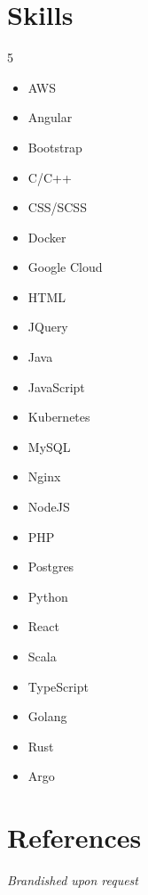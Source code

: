 \documentclass[letterpaper,11pt]{article}
\begin{document}
\section{Skills}
    \begin{multicols}{5}
    \begin{itemize}
        \item AWS
        \item Angular
        \item Bootstrap
        \item C/C++
        \item CSS/SCSS
        \item Docker
        \item Google Cloud
        \item HTML
        \item JQuery
        \item Java
        \item JavaScript
        \item Kubernetes
        \item MySQL
        \item Nginx
        \item NodeJS
        \item PHP
        \item Postgres
        \item Python
        \item React
        \item Scala
        \item TypeScript
        \item Golang
        \item Rust
        \item Argo
    \end{itemize}
    \end{multicols}
    
\section{References}
 \textit{Brandished upon request}

\end{document}
